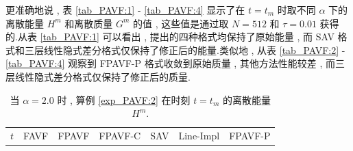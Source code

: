\newpage
	更准确地说 , 表 \ref{tab_PAVF:1} - \ref{tab_PAVF:4} 显示了在 $t=t_{m}$ 时取不同 $\alpha$ 下的离散能量 $H^{m}$ 和离散质量 $G^{m}$ 的值 , 
	这些值是通过取 $N=512$ 和 $\tau=0.01$ 获得的.从表 \ref{tab_PAVF:1} 可以看出 , 提出的四种格式均保持了原始能量 , 
	而 SAV 格式和三层线性隐式差分格式仅保持了修正后的能量.类似地 , 从表 \ref{tab_PAVF:2} - \ref{tab_PAVF:4} 观察到 FPAVF-P 格式收敛到原始质量 , 其他方法性能较差 , 而三层线性隐式差分格式仅保持了修正后的质量.

\begin{table}[H]\footnotesize
	\centering
	\caption{当 $\alpha=2.0$ 时 , 算例 \ref{exp_PAVF:2}  在时刻 $t=t_{m}$ 的离散能量 $H^{m}$.}

	  \begin{tabular}{lllllll}
	  \toprule
       $t$   &FAVF   &FPAVF   &FPAVF-C   &SAV    &Line-Impl   &FPAVF-P\\

\end{tabular}
\end{table}
